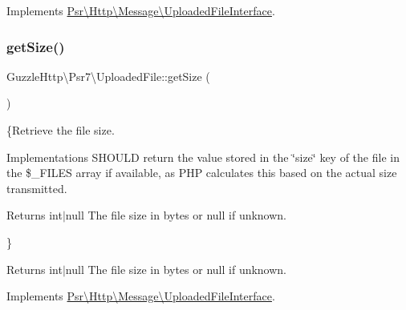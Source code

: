 Implements \hyperlink{interfacePsr_1_1Http_1_1Message_1_1UploadedFileInterface_a1c08f48bd2c0b20b37dfadf6f2c992e9}{Psr\textbackslash{}\+Http\textbackslash{}\+Message\textbackslash{}\+Uploaded\+File\+Interface}.

\mbox{\label{classGuzzleHttp_1_1Psr7_1_1UploadedFile_ac21d09bd109893eb961d927e96693079}} 
\subsubsection{\texorpdfstring{get\+Size()}{getSize()}}
{\footnotesize\ttfamily Guzzle\+Http\textbackslash{}\+Psr7\textbackslash{}\+Uploaded\+File\+::get\+Size (\begin{DoxyParamCaption}{ }\end{DoxyParamCaption})}

\{Retrieve the file size.

Implementations S\+H\+O\+U\+LD return the value stored in the \char`\"{}size\char`\"{} key of the file in the \$\+\_\+\+F\+I\+L\+ES array if available, as P\+HP calculates this based on the actual size transmitted.

\begin{DoxyReturn}{Returns}
int$\vert$null The file size in bytes or null if unknown.
\end{DoxyReturn}
\}

\begin{DoxyReturn}{Returns}
int$\vert$null The file size in bytes or null if unknown. 
\end{DoxyReturn}


Implements \hyperlink{interfacePsr_1_1Http_1_1Message_1_1UploadedFileInterface_a6fabb21af5c4053e1d561018a5d30051}{Psr\textbackslash{}\+Http\textbackslash{}\+Message\textbackslash{}\+Uploaded\+File\+Interface}.

\mbox{\label{classGuzzleHttp_1_1Psr7_1_1UploadedFile_a4626779cebe28308009f37701ad0d982}} 

